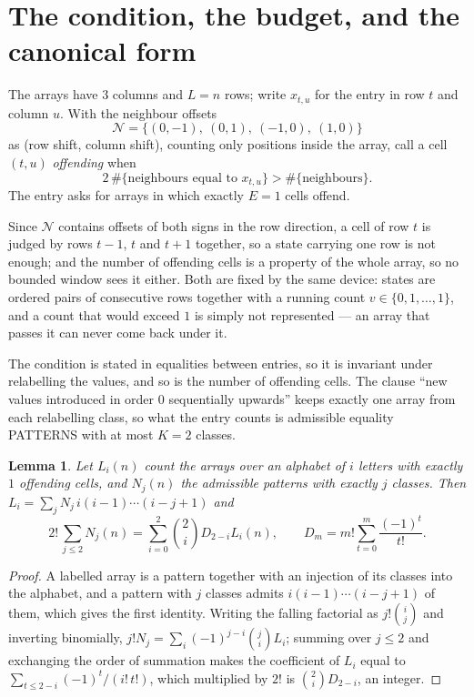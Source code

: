 \documentclass[11pt,a4paper]{article}
\theoremstyle{plain}
\newtheorem{lemma}[theorem]{Lemma}
\theoremstyle{definition}
\begin{document}
\section{The condition, the budget, and the canonical form}

The arrays have $3$ columns and $L=n$ rows; write $x_{t,u}$ for the entry in
row $t$ and column $u$. With the neighbour offsets
\[
\mathcal N=\{(0,-1),\ (0,1),\ (-1,0),\ (1,0)\}
\]
as (row shift, column shift), counting only positions inside the array, call a cell
$(t,u)$ \emph{offending} when
\[
2\,\#\{\text{neighbours equal to }x_{t,u}\}>\#\{\text{neighbours}\} .
\]
The entry asks for arrays in which exactly $E=1$ cells offend.

Since $\mathcal N$ contains offsets of both signs in the row direction, a cell of row
$t$ is judged by rows $t-1$, $t$ and $t+1$ together, so a state carrying one row is not
enough; and the number of offending cells is a property of the whole array, so no bounded
window sees it either. Both are fixed by the same device: states are ordered pairs of
consecutive rows together with a running count $v\in\{0,1,\dots,1\}$, and a count that
would exceed $1$ is simply not represented --- an array that passes it can never come back
under it.

The condition is stated in equalities between entries, so it is invariant under relabelling
the values, and so is the number of offending cells. The clause ``new values introduced in
order $0$ sequentially upwards'' keeps exactly one array from each relabelling class, so what
the entry counts is admissible equality PATTERNS with at most $K=2$ classes.

\begin{lemma}\label{lem:inv}
Let $L_i(n)$ count the arrays over an alphabet of $i$ letters with exactly $1$ offending
cells, and $N_j(n)$ the admissible patterns with exactly $j$ classes. Then
$L_i=\sum_j N_j\,i(i-1)\cdots(i-j+1)$ and
\[
2!\,\sum_{j\le2}N_j(n)=\sum_{i=0}^{2}\binom{2}{i}D_{2-i}L_i(n),
\qquad D_m=m!\sum_{t=0}^{m}\frac{(-1)^t}{t!} .
\]
\end{lemma}

\begin{proof}
A labelled array is a pattern together with an injection of its classes into the alphabet,
and a pattern with $j$ classes admits $i(i-1)\cdots(i-j+1)$ of them, which gives the first
identity. Writing the falling factorial as $j!\binom{i}{j}$ and inverting binomially,
$j!N_j=\sum_i(-1)^{j-i}\binom{j}{i}L_i$; summing over $j\le2$ and exchanging the
order of summation makes the coefficient of $L_i$ equal to
$\sum_{t\le2-i}(-1)^t/(i!\,t!)$, which multiplied by $2!$ is
$\binom{2}{i}D_{2-i}$, an integer.
\end{proof}
\end{document}
